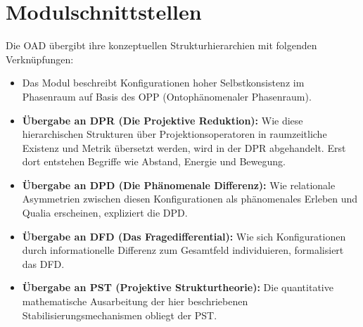 \documentclass[11pt,a4paper]{article}
\theoremstyle{plain}
\theoremstyle{definition}
\begin{document}
\section{Modulschnittstellen}

Die OAD \"{u}bergibt ihre konzeptuellen Strukturhierarchien mit folgenden
Verkn\"{u}pfungen:

\begin{itemize}
  \item Das Modul beschreibt Konfigurationen hoher Selbstkonsistenz im Phasenraum auf
        Basis des OPP (Ontoph\"{a}nomenaler Phasenraum).
  \item \textbf{\"{U}bergabe an DPR (Die Projektive Reduktion):} Wie diese hierarchischen
        Strukturen \"{u}ber Projektionsoperatoren in raumzeitliche Existenz und Metrik
        \"{u}bersetzt werden, wird in der DPR abgehandelt. Erst dort entstehen Begriffe
        wie Abstand, Energie und Bewegung.
  \item \textbf{\"{U}bergabe an DPD (Die Ph\"{a}nomenale Differenz):} Wie relationale
        Asymmetrien zwischen diesen Konfigurationen als ph\"{a}nomenales Erleben und
        Qualia erscheinen, expliziert die DPD.
  \item \textbf{\"{U}bergabe an DFD (Das Fragedifferential):} Wie sich Konfigurationen
        durch informationelle Differenz zum Gesamtfeld individuieren, formalisiert das
        DFD.
  \item \textbf{\"{U}bergabe an PST (Projektive Strukturtheorie):} Die quantitative
        mathematische Ausarbeitung der hier beschriebenen Stabilisierungsmechanismen
        obliegt der PST.
\end{itemize}
\end{document}

